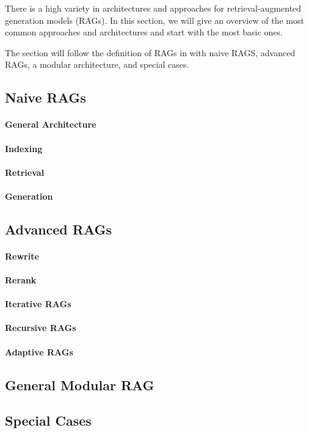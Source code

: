 There is a high variety in architectures and approaches for retrieval-augmented generation models (RAGs). In this section, we will give an overview of the most common approaches and architectures and start with the most basic ones.

The section will follow the definition of RAGs in  with naive RAGS, advanced RAGs, a modular architecture, and special cases.

\subsection{Naive RAGs}
\label{sec:naive_rags}

\paragraph{General Architecture}
\label{sec:general_architecture}

\paragraph{Indexing}
\label{sec:indexing}

\paragraph{Retrieval}
\label{sec:retrieval}

\paragraph{Generation}
\label{sec:generation}

\subsection{Advanced RAGs}
\label{sec:advanced_rags}

\paragraph{Rewrite}
\label{sec:rewrite}

\paragraph{Rerank}
\label{sec:rerank}

\paragraph{Iterative RAGs}
\label{sec:iterative}

\paragraph{Recursive RAGs}
\label{sec:recursive}

\paragraph{Adaptive RAGs}
\label{sec:adaptive}

\subsection{General Modular RAG}
\label{sec:modular_rag}

\subsection{Special Cases}
\label{sec:special_cases}